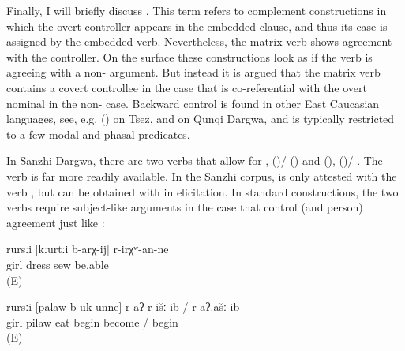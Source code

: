 Finally, I will briefly discuss . This term refers to complement constructions in which the overt controller appears in the embedded clause, and thus its case is assigned by the embedded verb. Nevertheless, the matrix verb shows agreement with the controller. On the surface these constructions look as if the verb is agreeing with a non- argument. But instead it is argued that the matrix verb contains a covert controllee in the  case that is co-referential with the overt nominal in the non- case. Backward control is found in other East Caucasian languages, see, e.g.  () on Tsez, and \citet{Serdobolskaya2010} on Qunqi Dargwa, and is typically restricted to a few modal and phasal predicates.

In Sanzhi Dargwa, there are two verbs that allow for ,  ()\slash{} ()  and  (),  ()\slash{} . The verb  is far more readily available. In the Sanzhi corpus,  is only attested with the verb , but can be obtained with  in elicitation. In standard  constructions, the two verbs require subject-like arguments in the  case that control  (and person) agreement just like :
%
\begin{exe}
	\ex
	\gll	rursːi	[kːurtːi	b-arχ-ij]	r-irχʷ-an-ne\\
		girl	dress	sew	be.able\\
	\glt	{} (E)

	\ex
	\gll	rursːi	[palaw	b-uk-unne]	r-aʔ	r-išː-ib	/	r-aʔ.ašː-ib\\
		girl	pilaw	eat \tsc{f-}begin	become	/ begin\\
	\glt	{} (E)
\end{exe}

